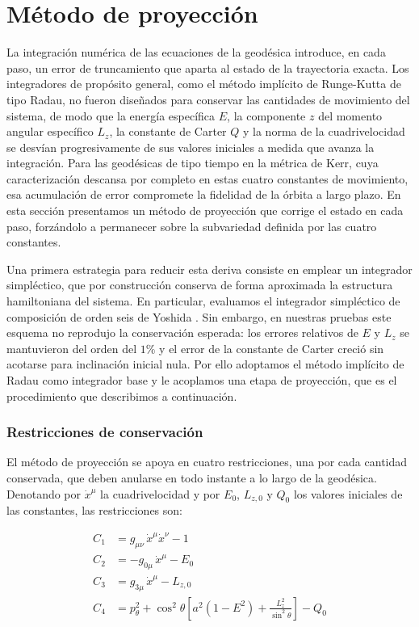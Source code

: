 \section{Método de proyección}

La integración numérica de las ecuaciones de la geodésica introduce, en cada paso, un error de truncamiento que aparta al estado de la trayectoria exacta. Los integradores de propósito general, como el método implícito de Runge-Kutta de tipo Radau, no fueron diseñados para conservar las cantidades de movimiento del sistema, de modo que la energía específica $E$, la componente $z$ del momento angular específico $L_z$, la constante de Carter $Q$ y la norma de la cuadrivelocidad se desvían progresivamente de sus valores iniciales a medida que avanza la integración. Para las geodésicas de tipo tiempo en la métrica de Kerr, cuya caracterización descansa por completo en estas cuatro constantes de movimiento, esa acumulación de error compromete la fidelidad de la órbita a largo plazo. En esta sección presentamos un método de proyección que corrige el estado en cada paso, forzándolo a permanecer sobre la subvariedad definida por las cuatro constantes.

Una primera estrategia para reducir esta deriva consiste en emplear un integrador simpléctico, que por construcción conserva de forma aproximada la estructura hamiltoniana del sistema. En particular, evaluamos el integrador simpléctico de composición de orden seis de Yoshida \cite{yoshida1990construction}. Sin embargo, en nuestras pruebas este esquema no reprodujo la conservación esperada: los errores relativos de $E$ y $L_z$ se mantuvieron del orden del $1\%$ y el error de la constante de Carter creció sin acotarse para inclinación inicial nula. Por ello adoptamos el método implícito de Radau como integrador base y le acoplamos una etapa de proyección, que es el procedimiento que describimos a continuación.

\subsubsection{Restricciones de conservación}

El método de proyección se apoya en cuatro restricciones, una por cada cantidad conservada, que deben anularse en todo instante a lo largo de la geodésica. Denotando por $\dot{x}^\mu$ la cuadrivelocidad y por $E_0$, $L_{z,0}$ y $Q_0$ los valores iniciales de las constantes, las restricciones son:

\begin{align}
    C_1 &= g_{\mu\nu}\,\dot{x}^\mu \dot{x}^\nu - 1 \label{eq:restriccion_norma} \\
    C_2 &= -g_{0\mu}\,\dot{x}^\mu - E_0 \label{eq:restriccion_energia} \\
    C_3 &= g_{3\mu}\,\dot{x}^\mu - L_{z,0} \label{eq:restriccion_momento} \\
    C_4 &= p_\theta^2 + \cos^2\theta \left[ a^2(1 - E^2) + \frac{L_z^2}{\sin^2\theta} \right] - Q_0 \label{eq:restriccion_carter}
\end{align}

